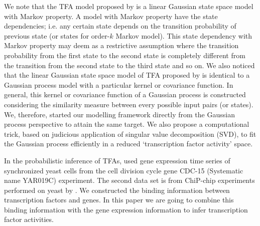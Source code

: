 We note that the TFA model proposed by \cite{Sanguinetti:2006} is a linear Gaussian state space model with Markov property. A model with Markov property have the state dependencies; i.e. any certain state depends on the transition probability of previous state (or states for order-$k$ Markov model).  This state dependency with Markov property may deem as a restrictive assumption where the transition probability from the first state to the second state is completely different from the transition from the second state to the third state and so on.  We also noticed that the linear Gaussian state space model of TFA proposed by \cite{Sanguinetti:2006} is identical to a Gaussian process model with a particular kernel or covariance function. In general, this kernel or covariance function of a Gaussian process is constructed considering the similarity measure between every possible input pairs (or states). We, therefore, started our modelling framework directly from the Gaussian process perspective to attain the same target. We also propose a computational trick, based on  judicious application of singular value decomposition (SVD), to fit the Gaussian process efficiently in a reduced \lq transcription factor activity\rq{ }space. 

In the probabilistic inference of TFAs, \cite{Spellman:1998} used gene expression time series of synchronized yeast cells from the cell division cycle gene CDC-15 (Systematic name YAR019C) experiment. 
The second data set is from ChiP-chip \cite{Ren:2000, Horak:2002} experiments performed on yeast by \cite{Lee:2002}. We constructed the binding information between transcription factors and genes. In this paper we are going to combine this binding information with the gene expression information to infer transcription factor activities.

